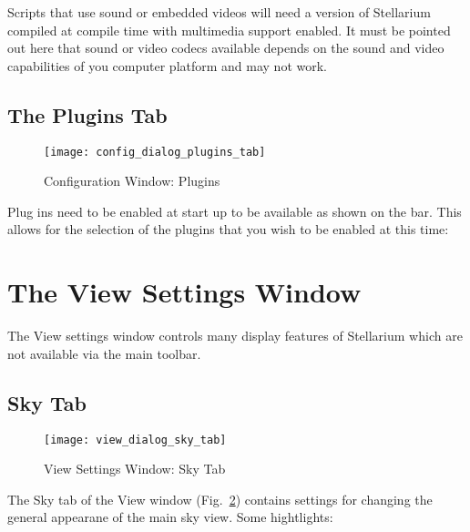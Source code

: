 Scripts that use sound or embedded videos will need a version of
Stellarium compiled at compile time with multimedia support
enabled. It must be pointed out here that sound or video codecs
available depends on the sound and video capabilities of you computer
platform and may not work.


\subsection{The Plugins Tab }
\label{sec:gui:plugins}


\begin{figure}[h]
\centering\texttt{[image: config\_dialog\_plugins\_tab]}
\caption{Configuration Window: Plugins}
\label{fig:gui:plugins}
\end{figure}

Plug ins need to be enabled at start up to be available
as shown on the bar. This allows for the selection of the plugins that
you wish to be enabled at this time:

\section{The View Settings Window}\label{the-view-settings-window}

The View settings window controls many display features of Stellarium
which are not available via the main toolbar.

\subsection{Sky Tab}\label{sky-tab}

\begin{figure}[h]
\centering\texttt{[image: view\_dialog\_sky\_tab]}
\caption{View Settings Window: Sky Tab}
\label{fig:viewwinskytab}
\end{figure}

The Sky tab of the View window (Fig.~\ref{fig:viewwinskytab}) contains settings
for changing the general appearane of the main sky view. Some
hightlights:

